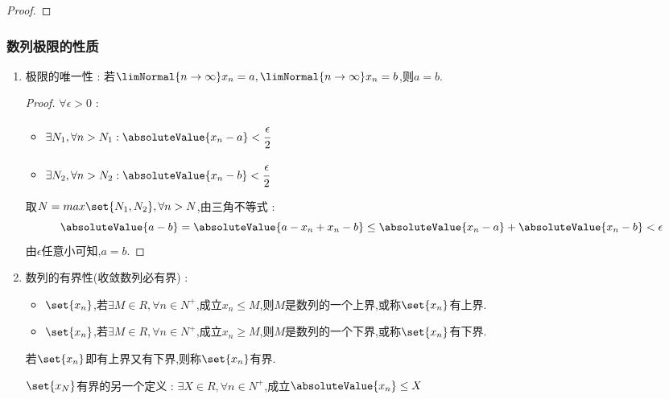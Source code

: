 {{{{\begin{enumerate}
{\begin{proof}
                  \end{proof}
                  }
        \end{enumerate}
    }%

    \subsubsection{数列极限的性质}{
        \begin{enumerate}
            \item {
                  极限的唯一性 : 若$\limNormal{n \to \infty}x_n = a,\limNormal{n \to \infty}x_n = b$,则$a = b$.

                  \begin{proof}
                      $\forall \epsilon > 0$ : \begin{itemize}
                          \item $\exists N_1,\forall n > N_1 : \absoluteValue{x_n - a} < \cfrac{\epsilon}{2}$
                          \item $\exists N_2,\forall n > N_2 : \absoluteValue{x_n - b} < \cfrac{\epsilon}{2}$
                      \end{itemize}
                      取$N = max\set{N_1,N_2},\forall n > N$,由三角不等式 : $$
                          \absoluteValue{a - b} = \absoluteValue{a - x_n + x_n - b} \leq \absoluteValue{x_n - a} + \absoluteValue{x_n - b} < \epsilon
                      $$
                      由$\epsilon$任意小可知,$a = b$.

                  \end{proof}
                  }
            \item {
                  数列的有界性(收敛数列必有界) :
                  \begin{itemize}
                      \item $\set{x_n}$,若$\exists M \in R,\forall n \in N^+$,成立$x_n \leq M$,则$M$是数列的一个上界,或称$\set{x_n}$有上界.
                      \item $\set{x_n}$,若$\exists M \in R,\forall n \in N^+$,成立$x_n \geq M$,则$M$是数列的一个下界,或称$\set{x_n}$有下界.
                  \end{itemize}

                  若$\set{x_n}$即有上界又有下界,则称$\set{x_n}$有界.

                  $\set{x_N}$有界的另一个定义 : $\exists X \in R,\forall n \in N^+$,成立$\absoluteValue{x_n} \leq X$

}
\end{enumerate}}}}}
